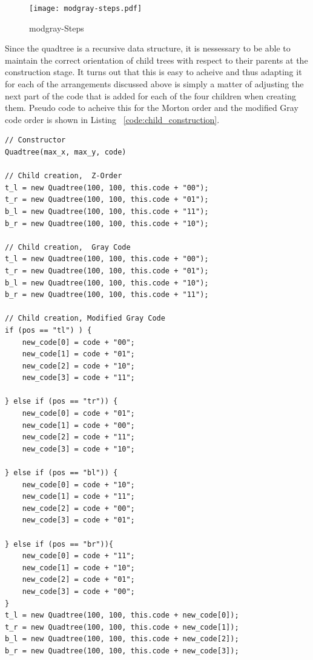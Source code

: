 \begin{figure}[ht]
	\centering
	\texttt{[image: modgray-steps.pdf]}
	\caption{modgray-Steps}
	\label{fig:modgray-steps}
\end{figure}

Since the quadtree is a recursive data structure, it is nessessary to be able
to maintain the correct orientation of child trees with respect to their
parents at the construction stage. It turns out that this is easy to acheive
and thus adapting it for each of the arrangements discussed above is simply a
matter of adjusting the next part of the code that is added for each of the
four children when creating them. Pseudo code to acheive this for the Morton
order and the modified Gray code order is shown in Listing
~\ref{code:child_construction}.

\begin{lstlisting}[caption={Code to generate children of the current quadtree
while maintaining the correct ordering.},label=code:child_construction]
// Constructor
Quadtree(max_x, max_y, code)

// Child creation,  Z-Order
t_l = new Quadtree(100, 100, this.code + "00");
t_r = new Quadtree(100, 100, this.code + "01");
b_l = new Quadtree(100, 100, this.code + "11");
b_r = new Quadtree(100, 100, this.code + "10");

// Child creation,  Gray Code
t_l = new Quadtree(100, 100, this.code + "00");
t_r = new Quadtree(100, 100, this.code + "01");
b_l = new Quadtree(100, 100, this.code + "10");
b_r = new Quadtree(100, 100, this.code + "11");

// Child creation, Modified Gray Code
if (pos == "tl") ) {
	new_code[0] = code + "00";
	new_code[1] = code + "01";
	new_code[2] = code + "10";
	new_code[3] = code + "11";

} else if (pos == "tr")) {
	new_code[0] = code + "01";
	new_code[1] = code + "00";
	new_code[2] = code + "11";
	new_code[3] = code + "10";

} else if (pos == "bl")) {
	new_code[0] = code + "10";
	new_code[1] = code + "11";
	new_code[2] = code + "00";
	new_code[3] = code + "01";

} else if (pos == "br")){
	new_code[0] = code + "11";
	new_code[1] = code + "10";
	new_code[2] = code + "01";
	new_code[3] = code + "00";
}
t_l = new Quadtree(100, 100, this.code + new_code[0]);
t_r = new Quadtree(100, 100, this.code + new_code[1]);
b_l = new Quadtree(100, 100, this.code + new_code[2]);
b_r = new Quadtree(100, 100, this.code + new_code[3]);
\end{lstlisting}
